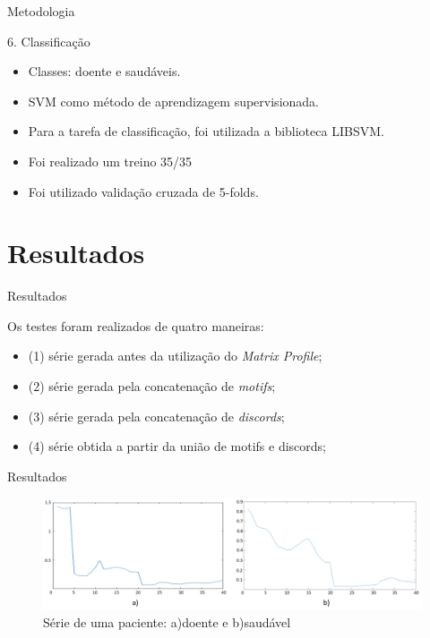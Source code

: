 \documentclass[apesctratio=169]{beamer}
\begin{document}
	\begin{frame}{Metodologia}
	    \begin{block}{6. Classificação}
	             \begin{itemize}
	                 \item Classes: doente e saudáveis.
	                 \item SVM como método de aprendizagem supervisionada.
	                 \item Para a tarefa de classificação, foi utilizada a biblioteca LIBSVM.
	                 \item Foi realizado um treino 35/35
	                 \item Foi utilizado validação cruzada de 5-folds.
	            \end{itemize}
	   \end{block}
	\end{frame}
	
	\section{Resultados}
	
	\begin{frame}{Resultados}
	\begin{block}{Os testes foram realizados de quatro maneiras:}
	             \begin{itemize}
	                 \item  (1) série gerada antes da utilização do \textit{Matrix Profile}; 
	                 \item  (2) série gerada pela concatenação de \textit{motifs}; 
	                 \item  (3) série gerada pela concatenação de \textit{discords};
	                 \item  (4) série obtida a partir da união de motifs e discords;
	            \end{itemize}
	\end{block}
	
	\end{frame}
	
	\begin{frame}{Resultados}
        \begin{figure}[htb]
			     \includegraphics[scale=0.35]{result.PNG}
			     \caption{Série de uma paciente: a)doente e b)saudável}
		\end{figure}
	\end{frame}
	
\end{document}
